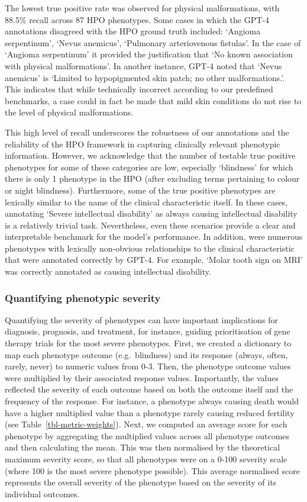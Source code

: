 \documentclass[
]{agujournal2019}
\begin{document}
The lowest true positive rate was observed for physical malformations,
with 88.5\% recall across 87 HPO phenotypes. Some cases in which the
GPT-4 annotations disagreed with the HPO ground truth included: `Angioma
serpentinum', `Nevus anemicus', `Pulmonary arteriovenous fistulas'. In
the case of `Angioma serpentinum' it provided the justification that `No
known association with physical malformations'. In another instance,
GPT-4 noted that `Nevus anemicus' is `Limited to hypopigmented skin
patch; no other malformations.'. This indicates that while technically
incorrect according to our predefined benchmarks, a case could in fact
be made that mild skin conditions do not rise to the level of physical
malformations.

This high level of recall underscores the robustness of our annotations
and the reliability of the HPO framework in capturing clinically
relevant phenotypic information. However, we acknowledge that the number
of testable true positive phenotypes for some of these categories are
low, especially `blindness' for which there is only 1 phenotype in the
HPO (after excluding terms pertaining to colour or night blindness).
Furthermore, some of the true positive phenotypes are lexically similar
to the name of the clinical characteristic itself. In these cases,
annotating `Severe intellectual disability' as always causing
intellectual disability is a relatively trivial task. Nevertheless, even
these scenarios provide a clear and interpretable benchmark for the
model's performance. In addition, were numerous phenotypes with
lexically non-obvious relationships to the clinical characteristic that
were annotated correctly by GPT-4. For example, `Molar tooth sign on
MRI' was correctly annotated as causing intellectual disability.

\subsubsection{Quantifying phenotypic
severity}\label{quantifying-phenotypic-severity}

Quantifying the severity of phenotypes can have important implications
for diagnosis, prognosis, and treatment, for instance, guiding
prioritisation of gene therapy trials for the most severe phenotypes.
First, we created a dictionary to map each phenotype outcome
(e.g.~blindness) and its response (always, often, rarely, never) to
numeric values from 0-3. Then, the phenotype outcome values were
multiplied by their associated response values. Importantly, the values
reflected the severity of each outcome based on both the outcome itself
and the frequency of the response. For instance, a phenotype always
causing death would have a higher multiplied value than a phenotype
rarely causing reduced fertility (see Table~\ref{tbl-metric-weights}).
Next, we computed an average score for each phenotype by aggregating the
multiplied values across all phenotype outcomes and then calculating the
mean. This was then normalised by the theoretical maximum severity
score, so that all phenotypes were on a 0-100 severity scale (where 100
is the most severe phenotype possible). This average normalised score
represents the overall severity of the phenotype based on the severity
of its individual outcomes.
\end{document}
